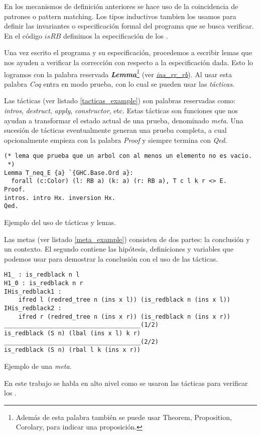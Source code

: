 En los mecanismos de definición anteriores se hace uso de la coincidencia de patrones o pattern matching. Los tipos inductivos tambien los usamos para definir las invariantes o especificación formal del programa 
que se busca verificar. En el c\'odigo \hyperref[inductive_isRB]{$isRB$} definimos la especificación 
de los {\arns}.

Una vez escrito el programa y su especificación, procedemos a escribir lemas que nos ayuden a verificar
la correcci\'on con respecto a la especificación dada. Esto lo logramos con la palabra reservada 
\textbf{\textit{Lemma}}\footnote{Además de esta palabra también se puede usar Theorem, Proposition, Corolary, para indicar una proposición.} (ver \hyperref[lema_1]{\textit{ins\_rr\_rb}}). Al usar esta palabra \textit{Coq} entra en modo 
prueba, con lo cual se pueden usar las \textit{t\'acticas}.

Las t\'acticas (ver listado \ref{tacticas_example}) son palabras reservadas como: \textit{intros}, \textit{destruct}, \textit{apply}, \textit{constructor}, etc. Estas 
t\'acticas son funciones que nos ayudan a transformar el estado actual de una prueba, denominado \textit{meta}. Una
sucesión de t\'acticas eventualmente generan una prueba completa, a cual opcionalmente empieza con la palabra \textit{Proof} y siempre termina con \textit{Qed}.

\begin{listing}[!ht]
\centering
\captionsetup{justification=centering}
\begin{verbatim}
(* lema que prueba que un arbol con al menos un elemento no es vacio.
 *)
Lemma T_neq_E {a} `{GHC.Base.Ord a}:
  forall (c:Color) (l: RB a) (k: a) (r: RB a), T c l k r <> E.
Proof.
intros. intro Hx. inversion Hx.
Qed.
\end{verbatim}
\caption{Ejemplo del uso de t\'acticas y lemas.}
\label{tacticas_example}
\end{listing}

Las metas (ver listado \ref{meta_example}) consisten de dos partes: la conclusi\'on y un contexto. El segundo contiene las hip\'otesis, definiciones y variables que podemos 
usar para demostrar la conclusi\'on con el uso de las t\'acticas. 
\begin{listing}[!ht]
\centering
\captionsetup{justification=centering}
\begin{verbatim}
H1_ : is_redblack n l
H1_0 : is_redblack n r
IHis_redblack1 :
    ifred l (redred_tree n (ins x l)) (is_redblack n (ins x l))
IHis_redblack2 :
    ifred r (redred_tree n (ins x r)) (is_redblack n (ins x r))
______________________________________(1/2)
is_redblack (S n) (lbal (ins x l) k r)
______________________________________(2/2)
is_redblack (S n) (rbal l k (ins x r))
\end{verbatim}
\caption{Ejemplo de una \textit{meta}.}
\label{meta_example}
\end{listing}
En este trabajo se habla en alto nivel como se usaron las t\'acticas para verificar los {\arns}.



